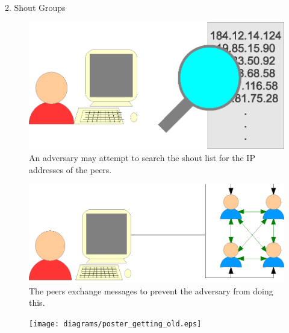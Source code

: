 \documentclass[ %
                    author={Luke Murray},
                supervisor={Dr. Simon Hollis},
                     title={Shadow Peer-to-Peer Networks},
                  subtitle={},
                    degree={MEng},
                      year={2013} ]{poster}
\begin{document}
\begin{frame}{}
\begin{columns}[t]
    \begin{column}{0.422\linewidth}
    \begin{block}{\normalsize 2. Shout Groups}
    \begin{figure}[h]
        \includegraphics{diagrams/poster_search_list.eps}
        \caption{An adversary may attempt to search the shout list for the IP addresses of the peers.}
    \end{figure}
    \begin{figure}[h]
        \includegraphics{diagrams/poster_d3.eps}
        \caption{The peers exchange messages to prevent the adversary from doing this.}
    \end{figure}
    \begin{figure}[h]
        \texttt{[image: diagrams/poster\_getting\_old.eps]}
        \caption{}
    \end{figure}
    \end{block}
    \end{column}
\end{columns}


\end{frame}
\end{document}
